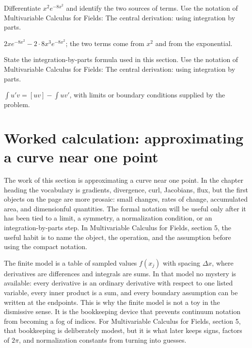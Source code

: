 \begin{exercise}
Differentiate \(x^2e^{-8x^2}\) and identify the two sources of terms.  Use the notation of Multivariable Calculus for Fields: The central derivation: using integration by parts.
\begin{answer}
\(2xe^{-8x^2}-2\cdot 8x^3e^{-8x^2}\); the two terms come from \(x^2\) and from the exponential.
\end{answer}
\end{exercise}

\begin{exercise}
State the integration-by-parts formula used in this section.  Use the notation of Multivariable Calculus for Fields: The central derivation: using integration by parts.
\begin{answer}
\(\int u'v=[uv]-\int uv'\), with limits or boundary conditions supplied by the problem.
\end{answer}
\end{exercise}



\section{Worked calculation: approximating a curve near one point}

The work of this section is approximating a curve near one point.  In the chapter heading the vocabulary is gradients, divergence, curl, Jacobians, flux, but the first objects on the page are more prosaic: small changes, rates of change, accumulated area, and dimensionful quantities.  The formal notation will be useful only after it has been tied to a limit, a symmetry, a normalization condition, or an integration-by-parts step.  In Multivariable Calculus for Fields, section 5, the useful habit is to name the object, the operation, and the assumption before using the compact notation.

The finite model is a table of sampled values \(f(x_j)\) with spacing \(\Delta x\), where derivatives are differences and integrals are sums.  In that model no mystery is available: every derivative is an ordinary derivative with respect to one listed variable, every inner product is a sum, and every boundary assumption can be written at the endpoints.  This is why the finite model is not a toy in the dismissive sense.  It is the bookkeeping device that prevents continuum notation from becoming a fog of indices.  For Multivariable Calculus for Fields, section 5, that bookkeeping is deliberately modest, but it is what later keeps signs, factors of \(2\pi\), and normalization constants from turning into guesses.

